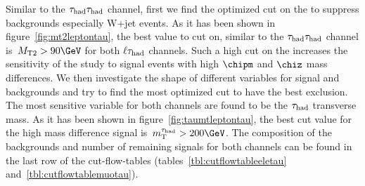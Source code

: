 Similar to the $\tau_{\rm had}\tau_{\rm had}$ channel, first we find the optimized cut on the \mttwo to suppress backgrounds especially W+jet events. As it has been shown in figure~\ref{fig:mt2leptontau}, the best value to cut on, similar to the $\tau_{\rm had}\tau_{\rm had}$ channel is $\mttwo > 90 \GeV$ for both $\ell\tau_{\rm had}$ channels. Such a high cut on the \mttwo increases the sensitivity of the study to signal events with high $\chipm$ and $\chiz$ mass differences. We then investigate the shape of different variables for signal and backgrounds and try to find the most optimized cut to have the best exclusion. The most sensitive variable for both channels are found to be the $\tau_{\rm had}$ transverse mass. As it has been shown in figure~\ref{fig:taumtleptontau}, the best cut value for the high mass difference signal is $\tauMT > 200 \GeV$. The composition of the backgrounds and number of remaining signals for both channels can be found in the last row of the cut-flow-tables (tables~\ref{tbl:cutflowtableeletau} and~\ref{tbl:cutflowtablemuotau}).

